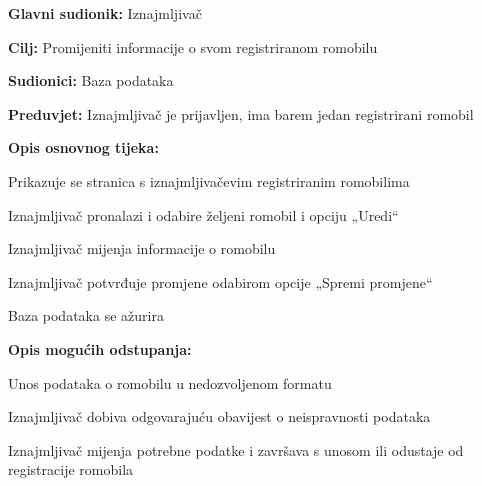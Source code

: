 						\begin{packed_item}
							
							\item \textbf{Glavni sudionik: }Iznajmljivač
							\item  \textbf{Cilj: }Promijeniti informacije o svom registriranom romobilu
							\item  \textbf{Sudionici:} Baza podataka
							\item  \textbf{Preduvjet:} Iznajmljivač je prijavljen, ima barem jedan registrirani romobil
							\item  \textbf{Opis osnovnog tijeka:}
							
							\item[] \begin{packed_enum}
								
								\item Prikazuje se stranica s iznajmljivačevim registriranim romobilima
								\item Iznajmljivač pronalazi i odabire željeni romobil i opciju „Uredi“
								\item Iznajmljivač mijenja informacije o romobilu
								\item Iznajmljivač potvrđuje promjene odabirom opcije „Spremi promjene“
								\item Baza podataka se ažurira
								
							\end{packed_enum}
							
							\item  \textbf{Opis mogućih odstupanja:}
							
							\item[] \begin{packed_item}
								
								\item[3.a] Unos podataka o romobilu u nedozvoljenom formatu
								\item[] \begin{packed_enum}
									
									\item Iznajmljivač dobiva odgovarajuću obavijest o neispravnosti podataka 
									\item Iznajmljivač mijenja potrebne podatke i završava s unosom ili odustaje od registracije romobila
									
								\end{packed_enum}
								
								
							\end{packed_item}
						\end{packed_item}
